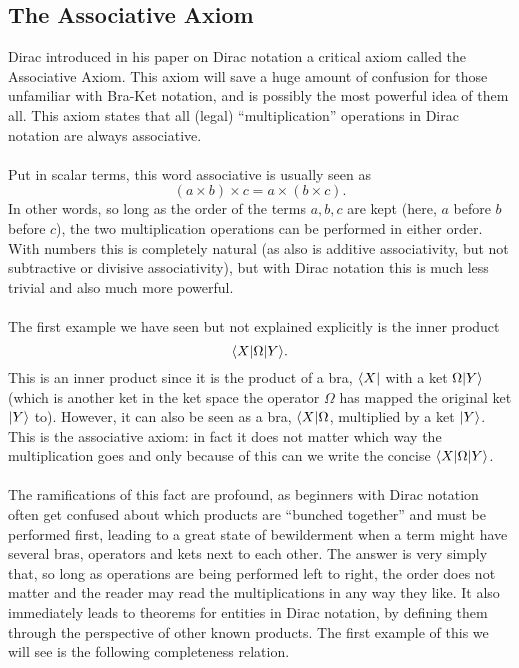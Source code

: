 \subsection{The Associative Axiom}
Dirac introduced in his paper on Dirac notation a critical axiom called the Associative Axiom. This axiom will save a huge amount of confusion for those unfamiliar with Bra-Ket notation, and is possibly the most powerful idea of them all. This axiom states that all (legal) ``multiplication'' operations in Dirac notation are always associative.
\\\\
Put in scalar terms, this word associative is usually seen as
$$
(a\times b)\times c = a \times (b\times c).
$$
In other words, so long as the order of the terms $a,b,c$ are kept (here, $a$ before $b$ before $c$), the two multiplication operations can be performed in either order. With numbers this is completely natural (as also is additive associativity, but not subtractive or divisive associativity), but with Dirac notation this is much less trivial and also much more powerful.
\\\\
The first example we have seen but not explained explicitly is the inner product 
$$
\langle X|{\Omega}|Y\rangle.
$$
This is an inner product since it is the product of a bra, $\langle X|$ with a ket $\Omega|Y\rangle$ (which is another ket in the ket space the operator $\Omega$ has mapped the original ket $|Y\rangle$ to). However, it can also be seen as a bra, $\langle X|\Omega$, multiplied by a ket $|Y\rangle$. This is the associative axiom: in fact it does not matter which way the multiplication goes and only because of this can we write the concise $\langle X|{\Omega}|Y\rangle$.
\\\\
The ramifications of this fact are profound, as beginners with Dirac notation often get confused about which products are ``bunched together'' and must be performed first, leading to a great state of bewilderment when a term might have several bras, operators and kets next to each other. The answer is very simply that, so long as operations are being performed left to right, the order does not matter and the reader may read the multiplications in any way they like. It also immediately leads to theorems for entities in Dirac notation, by defining them through the perspective of other known products. The first example of this we will see is the following completeness relation.
\\\\
